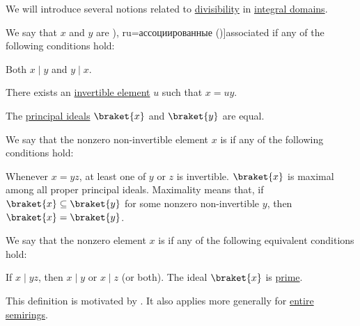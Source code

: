 \begin{definition}\label{def:domain_divisibility}
  We will introduce several notions related to \hyperref[def:divisibility]{divisibility} in \hyperref[def:integral_domain]{integral domains}.

  \begin{thmenum}
     We say that \( x \) and \( y \) are \term[bg=асоциирани (\cite[142]{ГеновМиховскиМоллов1991}), ru=ассоциированные (\cite[118]{Винберг2014})]{associated} if any of the following conditions hold:
    \begin{thmenum}
       Both \( x \mid y \) and \( y \mid x \).

       There exists an \hyperref[def:divisibility/invertible]{invertible element} \( u \) such that \( x = uy \).

       The \hyperref[def:semiring_ideal/principal]{principal ideals} \( \braket{ x } \) and \( \braket{ y } \) are equal.
    \end{thmenum}

     We say that the nonzero non-invertible element \( x \) is  if any of the following conditions hold:
    \begin{thmenum}
       Whenever \( x = yz \), at least one of \( y \) or \( z \) is invertible.
       \( \braket{ x } \) is maximal among all proper principal ideals. Maximality means that, if \( \braket{ x } \subseteq \braket{ y } \) for some nonzero non-invertible \( y \), then \( \braket{ x } = \braket{ y } \).
    \end{thmenum}

     We say that the nonzero element \( x \) is  if any of the following equivalent conditions hold:
    \begin{thmenum}
       If \( x \mid yz \), then \( x \mid y \) or \( x \mid z \) (or both).
       The ideal \( \braket{ x } \) is \hyperref[def:semiring_ideal/prime]{prime}.
    \end{thmenum}

    This definition is motivated by . It also applies more generally for \hyperref[def:entire_semiring]{entire semirings}.
  \end{thmenum}
\end{definition}
